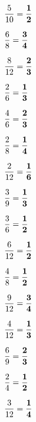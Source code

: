 \documentclass[a4paper, 11pt]{ltjsarticle}
\begin{document}
\renewcommand{\baselinestretch}{1.78}
\renewcommand{\labelenumi}{(\theenumi)}
\renewcommand{\labelenumii}{(\arabic{enumii})}

 \twocolumn[


 \vspace*{5ex} ]
 
  \begin{enumerate}

{\Large \item  $\displaystyle \frac{5}{10}={\bf \frac{1}{2}} $} \vfill
{\Large \item  $\displaystyle \frac{6}{8}={\bf \frac{3}{4}} $} \vfill
{\Large \item  $\displaystyle \frac{8}{12}={\bf \frac{2}{3}} $} \vfill
{\Large \item  $\displaystyle \frac{2}{6}={\bf \frac{1}{3}} $} \vfill
{\Large \item  $\displaystyle \frac{4}{6}={\bf \frac{2}{3}} $} \vfill
{\Large \item  $\displaystyle \frac{2}{8}={\bf \frac{1}{4}} $} \vfill
{\Large \item  $\displaystyle \frac{2}{12}={\bf \frac{1}{6}} $} \vfill
{\Large \item  $\displaystyle \frac{3}{9}={\bf \frac{1}{3}} $} \vfill

\newpage
 
{\Large \item  $\displaystyle \frac{3}{6}={\bf \frac{1}{2}} $} \vfill
{\Large \item  $\displaystyle \frac{6}{12}={\bf \frac{1}{2}} $} \vfill
{\Large \item  $\displaystyle \frac{4}{8}={\bf \frac{1}{2}} $} \vfill
{\Large \item  $\displaystyle \frac{9}{12}={\bf \frac{3}{4}} $} \vfill
{\Large \item  $\displaystyle \frac{4}{12}={\bf \frac{1}{3}} $} \vfill
{\Large \item  $\displaystyle \frac{6}{9}={\bf \frac{2}{3}} $} \vfill
{\Large \item  $\displaystyle \frac{2}{4}={\bf \frac{1}{2}} $} \vfill
{\Large \item  $\displaystyle \frac{3}{12}={\bf \frac{1}{4}} $} \vfill

  \end{enumerate}
  
\end{document}
